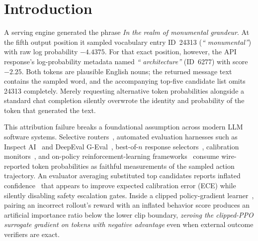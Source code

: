 \documentclass[11pt,letterpaper]{article}
\begin{document}
\section{Introduction}
A serving engine generated the phrase \emph{In the realm of monumental grandeur}. At the fifth output position it sampled vocabulary entry ID~24313 (\emph{`` monumental''}) with raw log probability $-4.4375$. For that exact position, however, the API response's log-probability metadata named \emph{`` architecture''} (ID~6277) with score $-2.25$. Both tokens are plausible English nouns; the returned message text contains the sampled word, and the accompanying top-five candidate list omits 24313 completely. Merely requesting alternative token probabilities alongside a standard chat completion silently overwrote the identity and probability of the token that generated the text.

This attribution failure breaks a foundational assumption across modern LLM software systems. Selective routers~\cite{omlxuser,mlxstream,geifman2017selective}, automated evaluation harnesses such as Inspect AI~\cite{inspect} and DeepEval G-Eval~\cite{liu2023geval,gevalpkg}, best-of-$n$ response selectors~\cite{bestofapi}, calibration monitors~\cite{guo2017calibration,monitor}, and on-policy reinforcement-learning frameworks~\cite{ppo,grpo,skyrl} consume wire-reported token probabilities as faithful measurements of the sampled action trajectory. An evaluator averaging substituted top candidates reports inflated confidence~\cite{indra} that appears to improve expected calibration error (ECE) while silently disabling safety escalation gates. Inside a clipped policy-gradient learner~\cite{ppo,grpo}, pairing an incorrect rollout's reward with an inflated behavior score produces an artificial importance ratio below the lower clip boundary, \emph{zeroing the clipped-PPO surrogate gradient on tokens with negative advantage} even when external outcome verifiers are exact.
\end{document}
